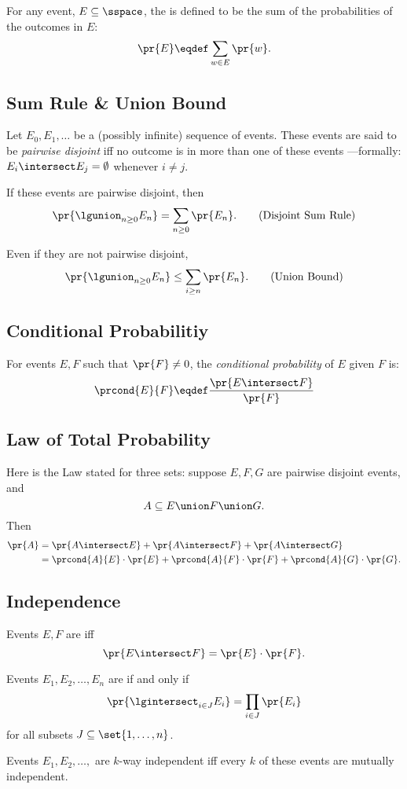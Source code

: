 \documentclass[handout]{mcs}
\begin{document}
{For any event, $E \subseteq \sspace$, the  is
defined to be the sum of the probabilities of the outcomes in $E$:
\[
\pr{E} \eqdef \sum_{w \in E} \pr{w}.
\]


\subsection{Sum Rule \& Union Bound}

Let $E_0,E_1,\dots$ be a (possibly infinite) sequence of events.  These
events are said to be \emph{pairwise disjoint} iff no outcome is in more
than one of these events ---formally: $E_i \intersect E_j = \emptyset$
whenever $i \neq j$.

If these events are pairwise disjoint, then
\begin{equation}
\pr{\lgunion_{n \geq 0} E_n} = \sum_{n \geq 0} \pr{E_n}.\tag{Disjoint Sum Rule}
\end{equation}

Even if they are not pairwise disjoint,
\begin{equation}
\pr{\lgunion_{n \geq 0} E_n} \leq \sum_{i \geq n} \pr{E_n}.\tag{Union Bound}
\end{equation}

\fi

\subsection*{Conditional Probabilitiy}
For events $E,F$ such that $\pr{F} \neq 0$, the \emph{conditional
    probability} of $E$ given $F$ is:
\[
\prcond{E}{F} \eqdef \frac{\pr{E \intersect F}}{\pr{F}}
\]

\subsection*{Law of Total Probability}

Here is the Law stated for three sets: suppose $E,F,G$ are pairwise
disjoint events, and
\[
A \subseteq E \union F \union G. 
\]
Then
\begin{align*}
\pr{A} & = \pr{A \intersect E}+ 
           \pr{A \intersect F}+ 
           \pr{A \intersect G}\\
 & = \prcond{A}{E} \cdot \pr{E} +
         \prcond{A}{F} \cdot \pr{F} +
         \prcond{A}{G} \cdot \pr{G}.
\end{align*}

\subsection*{Independence}

Events $E,F$ are  iff
\[
\pr{E \intersect F} = \pr{E}\cdot \pr{F}.
\]

Events $E_1, E_2, \dots, E_n$ are  if and only
if
%
\[
\pr{\lgintersect_{i \in J} E_i} = \prod_{i \in J} \pr{E_i}
\]
for all subsets $J \subseteq \set{1,\dots,n}$.

Events $E_1, E_2, \dots,$ are $k$-way independent iff every $k$
of these events are mutually independent.
}
\end{document}
